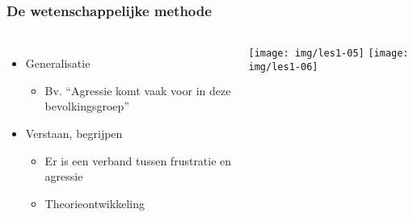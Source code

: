 \documentclass[aspectratio=169]{beamer}
\begin{document}
\begin{frame}
  \frametitle{De wetenschappelijke methode}

  \begin{columns}[c]

    \begin{itemize}
      \item Generalisatie
        \begin{itemize}
          \item Bv. ``Agressie komt vaak voor in deze bevolkingsgroep''
        \end{itemize}
      \item Verstaan, begrijpen
        \begin{itemize}
          \item Er is een verband tussen frustratie en agressie
          \item Theorieontwikkeling
        \end{itemize}
    \end{itemize}

    \texttt{[image: img/les1-05]}
    \vspace*{1cm}
    \texttt{[image: img/les1-06]}

  \end{columns}
\end{frame}
\end{document}
